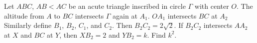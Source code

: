 Let $ABC$, $AB<AC$ be an acute triangle inscribed in circle $\Gamma$ with center $O$. The altitude from $A$ to $BC$ intersects $\Gamma$ again at $A_1$. $OA_1$ intersects $BC$ at $A_2$ Similarly define $B_1$, $B_2$, $C_1$, and $C_2$. Then $B_2C_2=2\sqrt{2}$. If $B_2C_2$ intersects $AA_2$ at $X$ and $BC$ at $Y$, then $XB_2=2$ and $YB_2=k$. Find $k^2$.